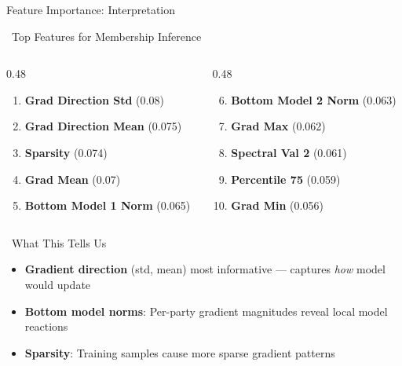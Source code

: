 \documentclass[aspectratio=169, 11pt]{beamer}
\begin{document}
\begin{frame}{Feature Importance: Interpretation}
    \begin{block}{\faChartBar\ Top Features for Membership Inference}
        \small
        \begin{columns}[T]
            \begin{column}{0.48\textwidth}
                \begin{enumerate}
                    \item \textbf{Grad Direction Std} (0.08)
                    \item \textbf{Grad Direction Mean} (0.075)
                    \item \textbf{Sparsity} (0.074)
                    \item \textbf{Grad Mean} (0.07)
                    \item \textbf{Bottom Model 1 Norm} (0.065)
                \end{enumerate}
            \end{column}
            \begin{column}{0.48\textwidth}
                \begin{enumerate}
                    \setcounter{enumi}{5}
                    \item \textbf{Bottom Model 2 Norm} (0.063)
                    \item \textbf{Grad Max} (0.062)
                    \item \textbf{Spectral Val 2} (0.061)
                    \item \textbf{Percentile 75} (0.059)
                    \item \textbf{Grad Min} (0.056)
                \end{enumerate}
            \end{column}
        \end{columns}
    \end{block}
    
    \vspace{0.3em}
    \begin{exampleblock}{\faLightbulb\ What This Tells Us}
        \begin{itemize}
            \item \textbf{Gradient direction} (std, mean) most informative --- captures \textit{how} model would update
            \item \textbf{Bottom model norms}: Per-party gradient magnitudes reveal local model reactions
            \item \textbf{Sparsity}: Training samples cause more sparse gradient patterns
        \end{itemize}
    \end{exampleblock}
\end{frame}
\end{document}
